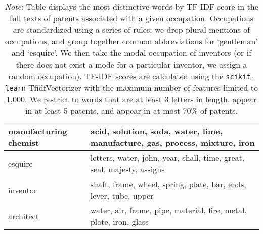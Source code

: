 \begin{table}[H]
\begin{tabular}{|l|p{12cm}|}
\hline
manufacturing chemist & acid, solution, soda, water, lime, manufacture, gas, process, mixture, iron \\
\hline
esquire & letters, water, john, year, shall, time, great, seal, majesty, assigns \\
\hline
inventor & shaft, frame, wheel, spring, plate, bar, ends, lever, tube, upper \\
\hline
architect & water, air, frame, pipe, material, fire, metal, plate, iron, glass \\
\hline
\end{tabular}
\caption*{\textit{Note}: Table displays the most distinctive words by TF-IDF score in the full texts of patents associated with a given occupation. Occupations are standardized using a series of rules: we drop plural mentions of
occupations, and group together common abbreviations for `gentleman' and `esquire'. We then take the modal
occupation of inventors (or if there does not exist a mode for a particular inventor, we assign a random
occupation). TF-IDF scores are calculated using the \texttt{scikit-learn} TfidfVectorizer with the maximum number of features limited to 1,000. We restrict to words that are at least 3 letters in length, appear in at least 5 patents, and appear in at most 70\% of patents.}
\label{table:distinctive_terms}
\end{table}